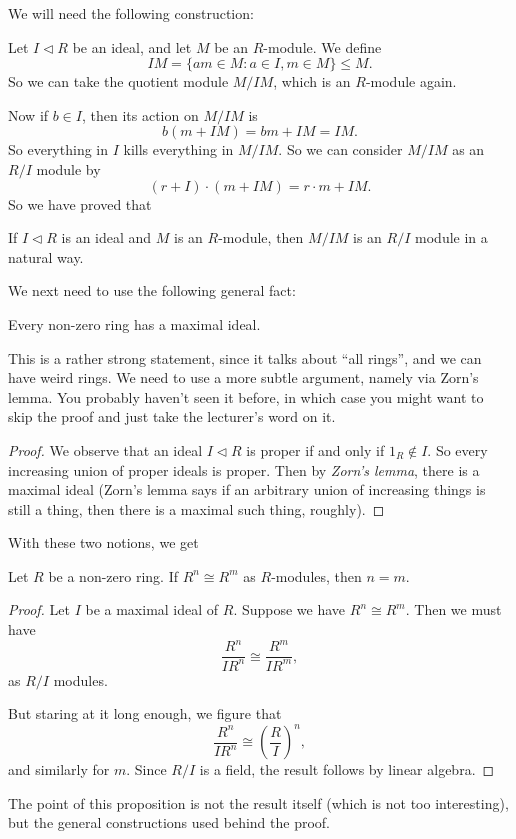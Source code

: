 \documentclass[a4paper]{article}
\begin{document}
We will need the following construction:

Let $I \lhd R$ be an ideal, and let $M$ be an $R$-module. We define
\[
  IM = \{a m \in M: a \in I, m \in M\} \leq M.
\]
So we can take the quotient module $M/IM$, which is an $R$-module again.

Now if $b \in I$, then its action on $M/IM$ is
\[
  b (m + IM) = bm + IM = IM.
\]
So everything in $I$ kills everything in $M/IM$. So we can consider $M/IM$ as an $R/I$ module by
\[
  (r + I)\cdot (m + IM) = r\cdot m + IM.
\]
So we have proved that
\begin{prop}
  If $I\lhd R$ is an ideal and $M$ is an $R$-module, then $M/IM$ is an $R/I$ module in a natural way.
\end{prop}
We next need to use the following general fact:

\begin{prop}
  Every non-zero ring has a maximal ideal.
\end{prop}
This is a rather strong statement, since it talks about ``all rings'', and we can have weird rings. We need to use a more subtle argument, namely via Zorn's lemma. You probably haven't seen it before, in which case you might want to skip the proof and just take the lecturer's word on it.

\begin{proof}
  We observe that an ideal $I \lhd R$ is proper if and only if $1_R \not\in I$. So every increasing union of proper ideals is proper. Then by \emph{Zorn's lemma}, there is a maximal ideal (Zorn's lemma says if an arbitrary union of increasing things is still a thing, then there is a maximal such thing, roughly).
\end{proof}

With these two notions, we get
\begin{prop}
  Let $R$ be a non-zero ring. If $R^n \cong R^m$ as $R$-modules, then $n = m$.
\end{prop}

\begin{proof}
  Let $I$ be a maximal ideal of $R$. Suppose we have $R^n \cong R^m$. Then we must have
  \[
    \frac{R^n}{IR^n} \cong \frac{R^m}{IR^m},
  \]
  as $R/I$ modules.

  But staring at it long enough, we figure that
  \[
    \frac{R^n}{IR^n} \cong \left(\frac{R}{I}\right)^n,
  \]
  and similarly for $m$. Since $R/I$ is a field, the result follows by linear algebra.
\end{proof}
The point of this proposition is not the result itself (which is not too interesting), but the general constructions used behind the proof.
\end{document}

